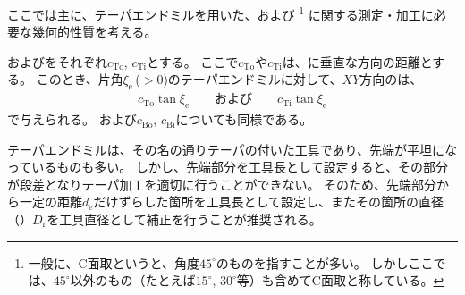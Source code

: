 

ここでは主に、テーパエンドミルを用いた、\textbf{\EndFaceOutCChamfer}および\textbf{\EndFaceInCChamfer}%
\footnote{一般に、C面取というと、角度$45^\circ$のものを指すことが多い。
しかしここでは、$45^\circ$以外のもの（たとえば$15^\circ$, $30^\circ$等）も含めてC面取と称している。}
に関する測定・加工に必要な幾何的性質を考える。



\TopEndFaceOutCChamferLength および\TopEndFaceInCChamferLength をそれぞれ$c_\mathrm{To}$, $c_\mathrm{Ti}$とする。
ここで$c_\mathrm{To}$や$c_\mathrm{Ti}$は、\EndFace に垂直な方向の距離とする。
このとき、片角$\xi_\mathrm e$\,($>0$)のテーパエンドミルに対して、$XY$方向の\EndFaceCChamferLength は、
\begin{align*}
  c_\mathrm{To}\tan\xi_\mathrm e\qquad\text{および}\qquad c_\mathrm{Ti}\tan\xi_\mathrm e
\end{align*}
で与えられる。
\BottomEndFaceOutCChamferLength および\TopEndFaceInCChamferLength$c_\mathrm{Bo}$, $c_\mathrm{Bi}$についても同様である。



テーパエンドミルは、その名の通りテーパの付いた工具であり、先端が平坦になっているものも多い。
しかし、先端部分を工具長として設定すると、その部分が段差となりテーパ加工を適切に行うことができない。
そのため、先端部分から一定の距離$d_\mathrm e$だけずらした箇所を工具長として設定し、またその箇所の直径（\textbf{\TaperEndMillReferenceDiameter}）$D_\mathrm r$を工具直径として補正を行うことが推奨される。

